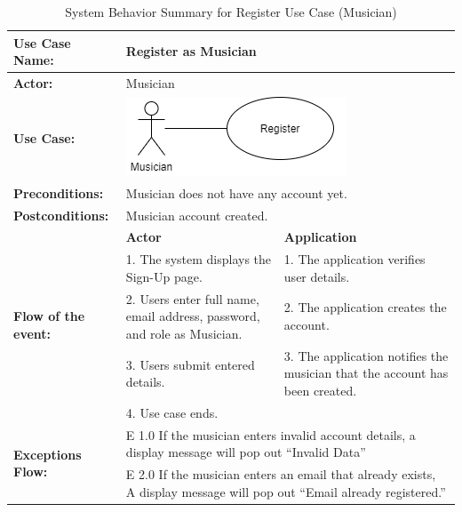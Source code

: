 \begin{longtable}{|p{3cm}|p{5cm}|p{5cm}|}
    \caption{System Behavior Summary for Register Use Case (Musician)} \\
    \hline
    \textbf{Use Case Name:} & \multicolumn{2}{l|}{Register as Musician} \\ \hline
    \textbf{Actor:} & \multicolumn{2}{l|}{Musician} \\ \hline
    \textbf{Use Case:} & \multicolumn{2}{l|}{\includegraphics[width=0.5\linewidth]{mainmatter/images/sucd1.png}} \\ \hline
    \textbf{Preconditions:} & \multicolumn{2}{p{10cm}|}{Musician does not have any account yet.} \\ \hline
    \textbf{Postconditions:} & \multicolumn{2}{p{10cm}|}{Musician account created.} \\ \hline
    \multirow{5}{3cm}{\raggedright \textbf{Flow of the event:}} & \textbf{Actor} & \textbf{Application} \\ \cline{2-3}
    & 1. The system displays the Sign-Up page. & 1. The application verifies user details. \\ \cline{2-3}
    & 2. Users enter full name, email address, password, and role as Musician. & 2. The application creates the account.  \\ \cline{2-3}
    & 3. Users submit entered details. & 3. The application notifies the musician that the account has been created.  \\ \cline{2-3}
    & 4. Use case ends. &  \\ \hline
    \multirow{2}{3cm}{\raggedright \textbf{Exceptions Flow:}} 
    & \multicolumn{2}{p{10cm}|}{\raggedright E 1.0 If the musician enters invalid account details, a display message will pop out “Invalid Data”} \\ \cline{2-3}
    & \multicolumn{2}{p{10cm}|}{\raggedright E 2.0 If the musician enters an email that already exists, A display message will pop out “Email already registered.”} \\ \hline
\end{longtable}
\pagebreak

